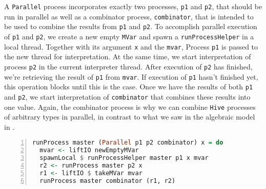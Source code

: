 A \texttt{Parallel} process incorporates exactly two processes, \texttt{p1} and \texttt{p2}, that should be run in parallel as well as a combinator process, \texttt{combinator}, that is intended to be used to combine the results from \texttt{p1} and \texttt{p2}. To accomplish parallel execution of \texttt{p1} and \texttt{p2}, we create a new empty \texttt{MVar} and spawn a \texttt{runProcessHelper} in a local thread. Together with its argument \texttt{x} and the \texttt{mvar}, Process \texttt{p1} is passed to the new thread for interpretation. At the same time, we start interpretation of process \texttt{p2} in the current interpreter thread. After execution of \texttt{p2} has finished, we're retrieving the result of \texttt{p1} from \texttt{mvar}. If execution of \texttt{p1} hasn't finished yet, this operation blocks until this is the case. Once we have the results of both \texttt{p1} and \texttt{p2}, we start interpretation of \texttt{combinator} that combines these results into one value. Again, the combinator process is why we can combine \texttt{Hive} processes of arbitrary types in parallel, in contrast to what we saw in the algebraic model in .
\begin{lstlisting}[language=Haskell,caption=Implementation of the interpreter for \texttt{Parallel} processes.,numbers=left,frame=bt,label=lst:runprocess_parallel]
runProcess master (Parallel p1 p2 combinator) x = do
  mvar <- liftIO newEmptyMVar
  spawnLocal $ runProcessHelper master p1 x mvar
  r2 <- runProcess master p2 x
  r1 <- liftIO $ takeMVar mvar
  runProcess master combinator (r1, r2)
\end{lstlisting}

